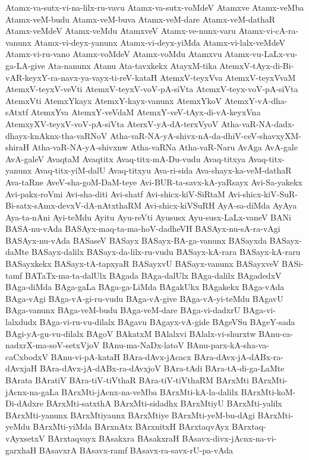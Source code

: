 {Atamx-va-sutx-vi-na-lilx-ru-vavu
Atamx-va-sutx-voMdeV
Atamxve
Atamx-veMba
Atamx-veM-budu
Atamx-veM-buva
Atamx-veM-dare
Atamx-veM-dathaR
Atamx-veMdeV
Atamx-veMdu
AtamxveV
Atamx-ve-nunx-varu
Atamx-vi-cA-ra-vanunx
Atamx-vi-deyx-yanunx
Atamx-vi-deyx-yiMda
Atamx-vi-lalx-veMdeV
Atamx-vi-ru-vano
Atamx-voMdeV
Atamx-voMdu
Atamxvu
Atamx-vu-LaLx-vu-ga-LA-give
Ata-nanunx
Atanu
Ata-tavxkekx
AtayxM-tika
AtemxV-tAyx-di-Bi-vAR-keyxY-ra-navx-ya-vayx-ti-reV-kataH
AtemxV-teyxVva
AtemxV-teyxVvaM
AtemxV-teyxV-veVti
AtemxV-teyxV-voV-pA-siVta
AtemxV-teyx-voV-pA-siVta
AtemxVti
AtemxYkayx
AtemxY-kayx-vanunx
AtemxYkoV
AtemxY-vA-dha-sAtxtf
AtemxYva
AtemxY-veVdaM
AtemxY-veV-tAyx-di-vA-keyxVna
AtemxyXV-teyxV-voV-pA-siVta
AterxV-yA-dA-terxVyoV
Atha-vaR-NA-dadx-dhayx-knAknx-tha-vaRNoV
Atha-vaR-NA-yA-shivx-nA-da-dhiV-ceV-shavxyXM-shiraH
Atha-vaR-NA-yA-shivxnw
Atha-vaRNa
Atha-vaR-Naru
AvAga
AvA-gale
AvA-galeV
AvaqtaM
Avaqtitx
Avaq-titx-mA-Du-vudu
Avaq-titxya
Avaq-titx-yanunx
Avaq-titx-yiM-dalU
Avaq-titxyu
Ava-ri-sida
Ava-shayx-ka-veM-dathaR
Ava-taRne
AveV-sha-goM-DaM-teye
Avi-BUR-ta-savx-kA-yaRsayx
Avi-Sa-yakekx
Avi-pakx-roVmi
Avi-sha-diti
Avi-shatf
Avi-shicx-kiV-SiRtaM
Avi-shicx-kiV-SuR-Bi-satx-sAmx-devxV-dA-nAtxthaRM
Avi-shicx-kiVSuRH
AyA-sa-diMda
AyAya
Aya-ta-nAni
Ayi-teMdu
Ayitu
Ayu-reVti
Ayususx
Ayu-susx-LaLx-vaneV
BANi
BASA-nu-vAda
BASAyx-maq-ta-ma-hoV-dadheVH
BASAyx-nu-sA-ra-vAgi
BASAyx-nu-vAda
BASaseV
BASayx
BASayx-BA-ga-vanunx
BASayxda
BASayx-daMte
BASayx-dalilx
BASayx-da-lilx-ru-vudu
BASayx-kA-rara
BASayx-kA-raru
BASayxkekx
BASayx-tA-tapxyaR
BASayxvU
BASayx-vanunx
BASayxveV
BASi-tamf
BATaTx-ma-ta-dalUlx
BAgada
BAga-dalUlx
BAga-dalilx
BAgadedxV
BAga-diMda
BAga-gaLa
BAga-ga-LiMda
BAgakUkx
BAgakekx
BAga-vAda
BAga-vAgi
BAga-vA-gi-ru-vudu
BAga-vA-give
BAga-vA-yi-teMdu
BAgavU
BAga-vanunx
BAga-veM-budu
BAga-veM-dare
BAga-vi-dadxrU
BAga-vi-lalxdudx
BAga-vi-ru-vu-dilalx
BAgavu
BAgayx-vA-gide
BAgeVSu
BAgeY-sada
BAgi-yA-gu-vu-dilalx
BAgoV
BAkatxM
BAlalxvi
BAlalx-vi-shurxtw
BAnu-ca-nadxrX-ma-soV-setxVjoV
BAnu-ma-NaDx-latoV
BAnu-parx-kA-sha-va-caCxbodxV
BAnu-vi-pA-kataH
BAra-dAvx-jAcacx
BAra-dAvx-jA-dABx-ra-dAvxjaH
BAra-dAvx-jA-dABx-ra-dAvxjoV
BAra-tAdi
BAra-tA-di-ga-LaMte
BArata
BAratiV
BAra-tiV-tiVthaR
BAra-tiV-tiVthaRM
BArxMti
BArxMti-jAcnx-na-gaLa
BArxMti-jAcnx-na-veMba
BArxMti-kA-la-dalilx
BArxMti-koM-Di-dAdxre
BArxMti-satxthA
BArxMti-sidadhx
BArxMtiyU
BArxMti-yalilx
BArxMti-yanunx
BArxMtiyaunx
BArxMtiye
BArxMti-yeM-bu-dAgi
BArxMti-yeMdu
BArxMti-yiMda
BArxnAtx
BArxnitxH
BArxtaqvAyx
BArxtaq-vAyxsetxV
BArxtaqvayx
BAsakxra
BAsakxraH
BAsavx-divx-jAcnx-na-vi-garxhaH
BAsavxrA
BAsavx-ramf
BAsavx-ra-savx-rU-pa-vAda
}
